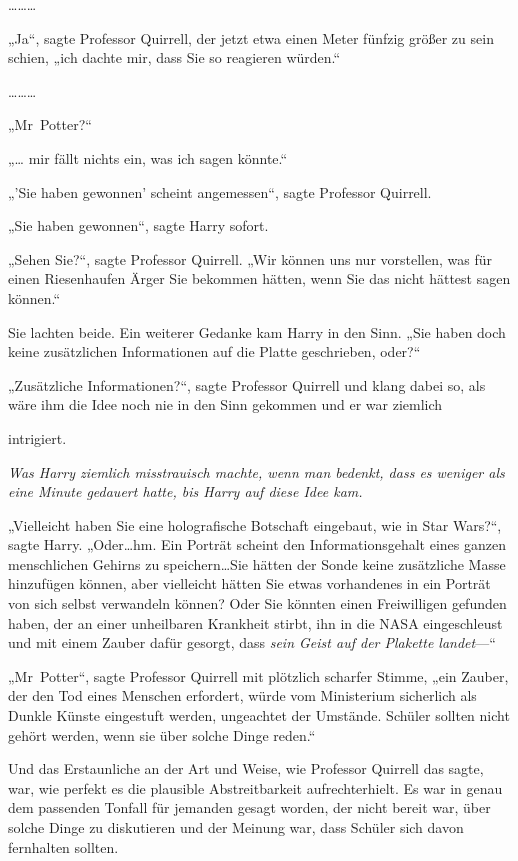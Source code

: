 {………

„Ja“, sagte Professor Quirrell, der jetzt etwa einen Meter fünfzig größer zu sein schien, „ich dachte mir, dass Sie so reagieren würden.“

………

„Mr~Potter?“

„… mir fällt nichts ein, was ich sagen könnte.“

„'Sie haben gewonnen' scheint angemessen“, sagte Professor Quirrell.

„Sie haben gewonnen“, sagte Harry sofort.

„Sehen Sie?“, sagte Professor Quirrell. „Wir können uns nur vorstellen, was für einen Riesenhaufen Ärger Sie bekommen hätten, wenn Sie das nicht hättest sagen können.“

Sie lachten beide. Ein weiterer Gedanke kam Harry in den Sinn. „Sie haben doch keine zusätzlichen Informationen auf die Platte geschrieben, oder?“

„Zusätzliche Informationen?“, sagte Professor Quirrell und klang dabei so, als wäre ihm die Idee noch nie in den Sinn gekommen und er war ziemlich

intrigiert.

\emph{Was Harry ziemlich misstrauisch machte, wenn man bedenkt, dass es weniger als eine Minute gedauert hatte, bis Harry auf diese Idee kam.}

„Vielleicht haben Sie eine holografische Botschaft eingebaut, wie in Star Wars?“, sagte Harry. „Oder…hm. Ein Porträt scheint den Informationsgehalt eines ganzen menschlichen Gehirns zu speichern…Sie hätten der Sonde keine zusätzliche Masse hinzufügen können, aber vielleicht hätten Sie etwas vorhandenes in ein Porträt von sich selbst verwandeln können? Oder Sie könnten einen Freiwilligen gefunden haben, der an einer unheilbaren Krankheit stirbt, ihn in die NASA eingeschleust und mit einem Zauber dafür gesorgt, dass \emph{sein Geist auf der Plakette landet}—“

„Mr~Potter“, sagte Professor Quirrell mit plötzlich scharfer Stimme, „ein Zauber, der den Tod eines Menschen erfordert, würde vom Ministerium sicherlich als Dunkle Künste eingestuft werden, ungeachtet der Umstände. Schüler sollten nicht gehört werden, wenn sie über solche Dinge reden.“

Und das Erstaunliche an der Art und Weise, wie Professor Quirrell das sagte, war, wie perfekt es die plausible Abstreitbarkeit aufrechterhielt. Es war in genau dem passenden Tonfall für jemanden gesagt worden, der nicht bereit war, über solche Dinge zu diskutieren und der Meinung war, dass Schüler sich davon fernhalten sollten.

}
